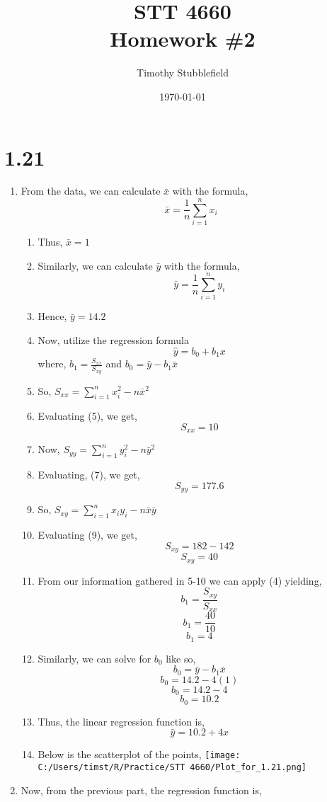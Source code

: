 \documentclass{article}
\title{STT 4660 \\ Homework \#2}
\author{Timothy Stubblefield}
\date{\today}
\begin{document}
	
\maketitle

\section*{1.21}
	\begin{enumerate}[label= \alph*)]
		\item From the data, we can calculate $\bar{x}$ with the formula,
			\[\bar{x} = \frac{1}{n}\sum_{i=1}^n x_i\]
		\begin{enumerate}[label = \arabic*)]
			\item Thus, $\bar{x} = 1$
			\item Similarly, we can calculate $\bar{y}$ with the formula,
				\[\bar{y} = \frac{1}{n}\sum_{i=1}^n y_i\]
			\item Hence, $\bar{y} = 14.2$
			\item Now, utilize the regression formula 
				\[\hat{y} = b_0 + b_1x\]   where,
				$b_1 = \frac{S_{xx}}{S_{xy}}$ and $b_0 = \hat{y} - b_1\bar{x}$
			\item So, $S_{xx} = \sum_{i=1}^n x_i^2 - n\bar{x}^2$
			\item Evaluating (5), we get,
				\[S_{xx} = 10\]
			\item Now, $S_{yy} = \sum_{i=1}^n y_i^2 - n\bar{y}^2$
			\item Evaluating, (7), we get,
				\[S_{yy} = 177.6\]
			\item So, $S_{xy} = \sum_{i=1}^n x_iy_i - n\bar{x}\bar{y}$
			\item Evaluating (9), we get, 
				\[S_{xy} = 182-142\]
				\[S_{xy} = 40\]
			\item From our information gathered in 5-10 we can apply (4) yielding,
				\[b_1 = \frac{S_{xy}}{S_{xx}}\]
				\[b_1 = \frac{40}{10}\]
				\[b_1 = 4\]
			\item Similarly, we can solve for $b_0$ like so,
				\[b_0 = \bar{y} - b_1\bar{x}\]
				\[b_0 = 14.2 - 4(1)\]
				\[b_0 = 14.2 - 4\]
				\[b_0 = 10.2\]
			\item Thus, the linear regression function is,
				\[\hat{y} = 10.2 + 4x\]
			\item Below is the scatterplot of the points,
				\centering
				\texttt{[image: C:/Users/timst/R/Practice/STT 4660/Plot\_for\_1.21.png]}
		\end{enumerate}
		\item Now, from the previous part, the regression function is,

\end{enumerate}
\end{document}
